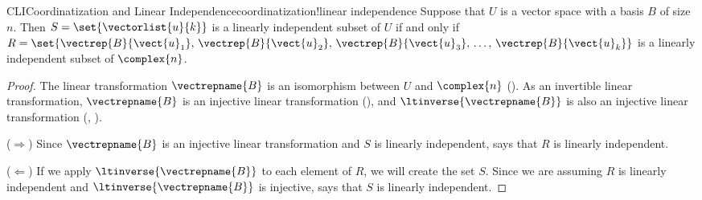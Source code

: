 %
\begin{theorem}{CLI}{Coordinatization and Linear Independence}{coordinatization!linear independence}
Suppose that $U$ is a vector space with a basis $B$ of size $n$.  Then $S=\set{\vectorlist{u}{k}}$ is a linearly independent subset of $U$ if and only if $R=\set{\vectrep{B}{\vect{u}_1},\,\vectrep{B}{\vect{u}_2},\,\vectrep{B}{\vect{u}_3},\,\ldots,\,\vectrep{B}{\vect{u}_k}}$ is a linearly independent subset of $\complex{n}$.
\end{theorem}
%
\begin{proof}
The linear transformation $\vectrepname{B}$ is an isomorphism between $U$ and $\complex{n}$ ().   As an invertible linear transformation, $\vectrepname{B}$ is an injective linear transformation (),  and $\ltinverse{\vectrepname{B}}$ is also an injective linear transformation (, ).\par
%
($\Rightarrow$)  Since $\vectrepname{B}$ is an injective linear transformation and $S$ is linearly independent,  says that $R$ is linearly independent.\par
%
($\Leftarrow$)  If we apply $\ltinverse{\vectrepname{B}}$ to each element of $R$, we will create the set $S$.  Since we are assuming $R$ is linearly independent and $\ltinverse{\vectrepname{B}}$ is injective,  says that $S$ is linearly independent.
%
\end{proof}
%


